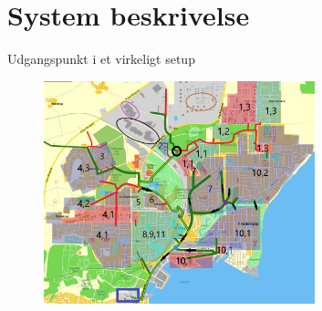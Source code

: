 \section{System beskrivelse} %


\begin{frame}{Udgangspunkt i et virkeligt setup}{}
\begin{figure}[H]
\centering
\includegraphics[width=0.7\textwidth]{Sections/pictures/kloakgrid_simplified10.png}
\end{figure}
\end{frame}


